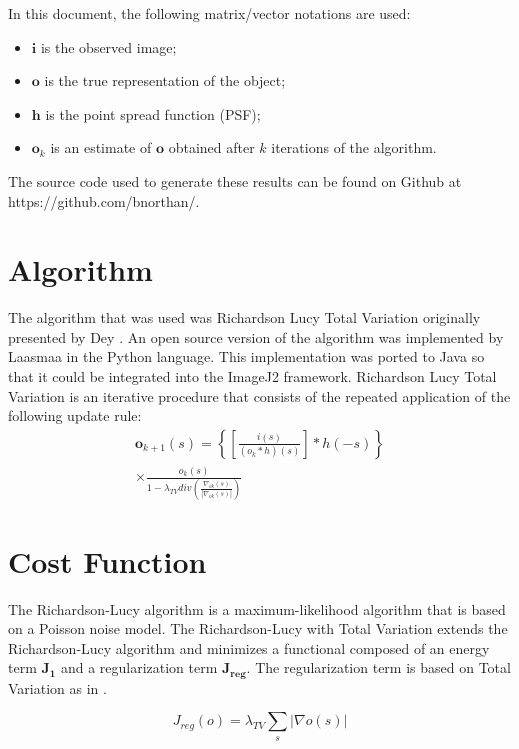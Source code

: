 \documentclass[conference,a4paper]{IEEEtran}
\begin{document}
In this document, the following matrix/vector notations are used:
\begin{itemize}
	\item $\mathbf{i}$ is the observed image;	
	\item $\mathbf{o}$ is the true representation of the object;
	\item $\mathbf{h}$ is the point spread function (PSF);
	\item $\mathbf{o}_k$ is an estimate of $\mathbf{o}$ obtained after $k$ iterations of the algorithm.
\end{itemize}

The source code used to generate these results can be found on Github at https://github.com/bnorthan/.

\section{Algorithm}

The algorithm that was used was Richardson Lucy Total Variation originally presented by Dey \cite{dey2006}.  An open source version of the algorithm was implemented by Laasmaa \cite{laasmaa2011} in the Python language.  This implementation was ported to Java so that it could be integrated into the ImageJ2 framework.  Richardson Lucy Total Variation is an iterative procedure that consists of the repeated application of the following update rule:
\begin{multline} \label{eq:tv_update}
	\mathbf{o}_{k+1}(s) = \left\{\left[\frac{i(s)}{(o_{k}*h)(s)}\right]*h(-s)\right\}\\\times\frac{{o}_{k}(s)}{1-\lambda_{TV}div\left({\frac{\nabla_{ok}(s)}{|\nabla_{ok}(s)|}}\right)}
\end{multline}

\section{Cost Function}

The Richardson-Lucy algorithm is a maximum-likelihood algorithm that is based on a Poisson noise model.  The Richardson-Lucy with Total Variation extends the Richardson-Lucy algorithm and minimizes a functional composed of an energy term \(\mathbf{J_{1}}\) and a regularization term \(\mathbf{J_{reg}}\).  The regularization term is based on Total Variation as in \cite{rudin1992}.

\begin{equation} \label{eq:tv}
{J_{reg}(o)} = \lambda_{TV}\sum_{s}|\nabla{o(s)}|
\end{equation}
\end{document}
